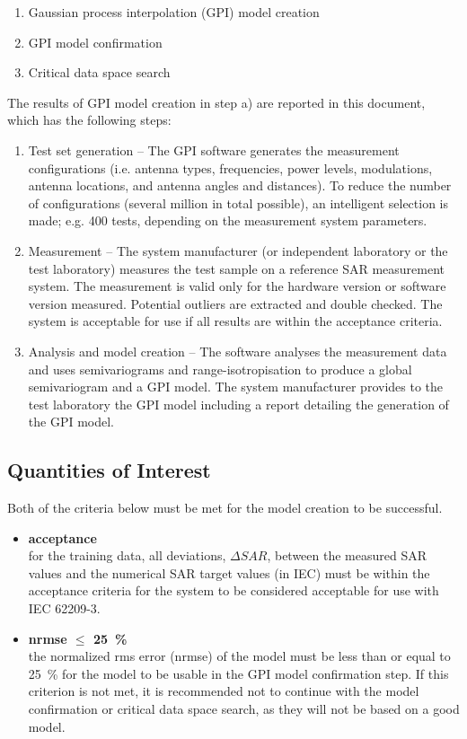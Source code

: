 \documentclass{article}
\begin{document}
\begin{enumerate}[label=\alph*)]
\item Gaussian process interpolation (GPI) model creation
\item GPI model confirmation
\item Critical data space search
\end{enumerate}

The results of GPI model creation in step a) are reported in this document, which has the following steps:

\begin{enumerate}[label=\arabic*)]
\item Test set generation -- The GPI software generates the measurement configurations (i.e. antenna types, frequencies, power levels, modulations, antenna locations, and antenna angles and distances). To reduce the number of configurations (several million in total possible), an intelligent selection is made; e.g. 400 tests, depending on the measurement system parameters.
\item Measurement -- The system manufacturer (or independent laboratory or the test laboratory) measures the test sample on a reference SAR measurement system. The measurement is valid only for the hardware version or software version measured. Potential outliers are extracted and double checked. The system is acceptable for use if all results are within the acceptance criteria.
\item Analysis and model creation -- The software analyses the measurement data and uses semivariograms and range-isotropisation to produce a global semivariogram and a GPI model. The system manufacturer provides to the test laboratory the GPI model including a report detailing the generation of the GPI model.
\end{enumerate}

\subsection{Quantities of Interest}\label{sec:quantities}

Both of the criteria below must be met for the model creation to be successful.

\begin{itemize}
\item \textbf{acceptance}\\ for the training data, all deviations, $\Delta SAR$, between the measured SAR values and the numerical SAR target values (in IEC)  must be within the acceptance criteria for the system to be considered acceptable for use with IEC 62209-3.

\item \textbf{nrmse $\le$ 25~\%}\\ the normalized rms error (nrmse) of the model must be less than or equal to 25~\% for the model to be usable in the GPI model confirmation step. If this criterion is not met, it is recommended not to continue with the model confirmation or critical data space search, as they will not be based on a good model.
\end{itemize}
\end{document}
